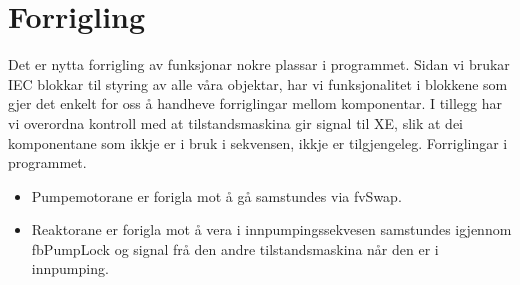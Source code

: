\section{Forrigling}
\thispagestyle{fancy}


Det er nytta \gls{forrigling} av funksjonar nokre plassar i programmet. 
Sidan vi brukar IEC blokkar til styring av alle våra objektar, har vi funksjonalitet i blokkene som gjer det enkelt for oss å 
handheve forriglingar mellom komponentar.
I tillegg har vi overordna kontroll med at tilstandsmaskina gir signal til XE, 
slik at dei komponentane som ikkje er i bruk i sekvensen, ikkje er tilgjengeleg.
Forriglingar i programmet.

\begin{itemize}
    \item Pumpemotorane er forigla mot å gå samstundes via fvSwap.
    \item Reaktorane er forigla mot å vera i innpumpingssekvesen samstundes igjennom fbPumpLock 
    og signal frå den andre tilstandsmaskina når den er i innpumping.
\end{itemize}












